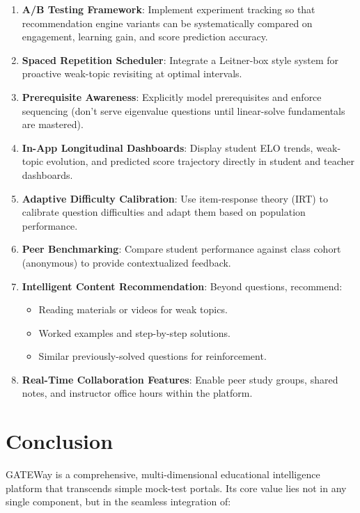 \documentclass[sigconf,authordraft,twoside]{acmart}
\newcommand{\project}{GATEWay}
\begin{document}
\begin{enumerate}
\item \textbf{A/B Testing Framework}: Implement experiment tracking so that recommendation engine variants can be systematically compared on engagement, learning gain, and score prediction accuracy.

\item \textbf{Spaced Repetition Scheduler}: Integrate a Leitner-box style system for proactive weak-topic revisiting at optimal intervals.

\item \textbf{Prerequisite Awareness}: Explicitly model prerequisites and enforce sequencing (don't serve eigenvalue questions until linear-solve fundamentals are mastered).

\item \textbf{In-App Longitudinal Dashboards}: Display student ELO trends, weak-topic evolution, and predicted score trajectory directly in student and teacher dashboards.

\item \textbf{Adaptive Difficulty Calibration}: Use item-response theory (IRT) to calibrate question difficulties and adapt them based on population performance.

\item \textbf{Peer Benchmarking}: Compare student performance against class cohort (anonymous) to provide contextualized feedback.

\item \textbf{Intelligent Content Recommendation}: Beyond questions, recommend:
   \begin{itemize}
   \item Reading materials or videos for weak topics.
   \item Worked examples and step-by-step solutions.
   \item Similar previously-solved questions for reinforcement.
   \end{itemize}

\item \textbf{Real-Time Collaboration Features}: Enable peer study groups, shared notes, and instructor office hours within the platform.
\end{enumerate}

\section{Conclusion}

\project{} is a comprehensive, multi-dimensional educational intelligence platform that transcends simple mock-test portals. Its core value lies not in any single component, but in the seamless integration of:
\end{document}
